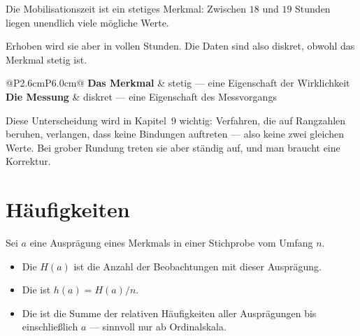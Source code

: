 \begin{warnung}
Die Mobilisationszeit ist ein stetiges Merkmal: Zwischen $18$ und $19$ Stunden liegen unendlich viele mögliche Werte.

Erhoben wird sie aber in vollen Stunden. Die Daten sind also diskret, obwohl das Merkmal stetig ist.

\begin{center}
\renewcommand{\arraystretch}{1.5}
\begin{tabular}{@{}P{2.6cm}P{6.0cm}@{}}
\toprule
\textbf{Das Merkmal} & stetig --- eine Eigenschaft der Wirklichkeit\\
\textbf{Die Messung} & diskret --- eine Eigenschaft des Messvorgangs\\
\bottomrule
\end{tabular}
\end{center}

Diese Unterscheidung wird in Kapitel~9 wichtig: Verfahren, die auf Rangzahlen beruhen, verlangen, dass keine Bindungen auftreten --- also keine zwei gleichen Werte. Bei grober Rundung treten sie aber ständig auf, und man braucht eine Korrektur.
\end{warnung}

\section{Häufigkeiten}

\begin{definition}
Sei $a$ eine Ausprägung eines Merkmals in einer Stichprobe vom Umfang $n$.
\begin{itemize}[leftmargin=1.4em, itemsep=4pt]
\item Die  $H(a)$ ist die Anzahl der Beobachtungen mit dieser Ausprägung.
\item Die  ist $h(a) = H(a)/n$.
\item Die  ist die Summe der relativen Häufigkeiten aller Ausprägungen bis einschließlich $a$ --- sinnvoll nur ab Ordinalskala.
\end{itemize}
\end{definition}

